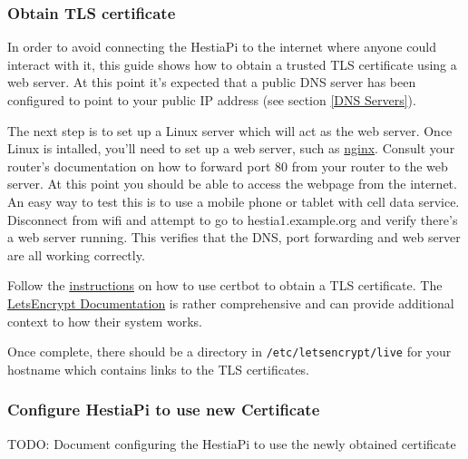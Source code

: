 \subsubsection{Obtain TLS certificate}
In order to avoid connecting the HestiaPi to the internet where anyone could
interact with it, this guide shows how to obtain a trusted TLS certificate
using a web server.  At this point it's expected that a public DNS server has
been configured to point to your public IP address (see section
\ref{DNS Servers}).

The next step is to set up a Linux server which will act as the web server.
Once Linux is intalled, you'll need to set up a web server, such as
\href{https://www.nginx.com/resources/wiki/start/topics/tutorials/install/}
{nginx}.  Consult your router's documentation on how to forward port 80 from
your router to the web server.  At this point you should be able to access the
webpage from the internet.  An easy way to test this is to use a mobile phone
or tablet with cell data service.  Disconnect from wifi and attempt to go to
hestia1.example.org and verify there's a web server running.  This verifies
that the DNS, port forwarding and web server are all working correctly.

Follow the \href{https://certbot.eff.org/instructions}{instructions} on how to
use certbot to obtain a TLS certificate.  The
\href{https://letsencrypt.org/docs/}{LetsEncrypt Documentation} is rather
comprehensive and can provide additional context to how their system works.

Once complete, there should be a directory in \texttt{/etc/letsencrypt/live}
for your hostname which contains links to the TLS certificates.

\subsubsection{Configure HestiaPi to use new Certificate}
TODO: Document configuring the HestiaPi to use the newly obtained certificate

